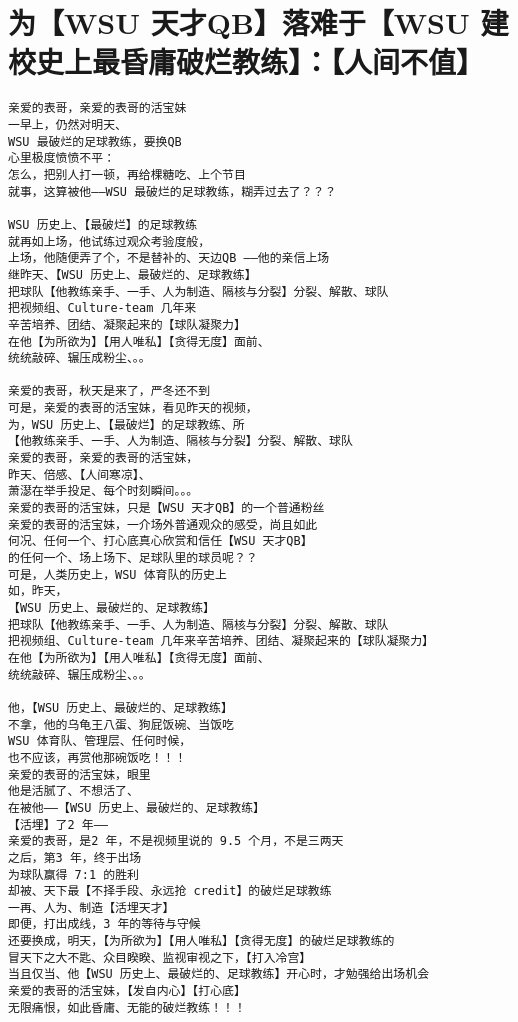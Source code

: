 \documentclass[9pt, b5paper]{article}
\begin{document}
\section{为【WSU 天才QB】落难于【WSU 建校史上最昏庸破烂教练】：【人间不值】}
\label{sec-6}
\begin{verbatim}
亲爱的表哥，亲爱的表哥的活宝妹
一早上，仍然对明天、
WSU 最破烂的足球教练，要换QB
心里极度愤愤不平：
怎么，把别人打一顿，再给棵糖吃、上个节目
就事，这算被他——WSU 最破烂的足球教练，糊弄过去了？？？

WSU 历史上、【最破烂】的足球教练
就再如上场，他试练过观众考验度般，
上场，他随便弄了个，不是替补的、天边QB ——他的亲信上场
继昨天、【WSU 历史上、最破烂的、足球教练】
把球队【他教练亲手、一手、人为制造、隔核与分裂】分裂、解散、球队
把视频组、Culture-team 几年来
辛苦培养、团结、凝聚起来的【球队凝聚力】
在他【为所欲为】【用人唯私】【贪得无度】面前、
统统敲碎、辗压成粉尘、。。

亲爱的表哥，秋天是来了，严冬还不到
可是，亲爱的表哥的活宝妹，看见昨天的视频，
为，WSU 历史上、【最破烂】的足球教练、所
【他教练亲手、一手、人为制造、隔核与分裂】分裂、解散、球队
亲爱的表哥，亲爱的表哥的活宝妹，
昨天、倍感、【人间寒凉】、
萧濏在举手投足、每个时刻瞬间。。。
亲爱的表哥的活宝妹，只是【WSU 天才QB】的一个普通粉丝
亲爱的表哥的活宝妹，一介场外普通观众的感受，尚且如此
何况、任何一个、打心底真心欣赏和信任【WSU 天才QB】
的任何一个、场上场下、足球队里的球员呢？？
可是，人类历史上，WSU 体育队的历史上
如，昨天，
【WSU 历史上、最破烂的、足球教练】
把球队【他教练亲手、一手、人为制造、隔核与分裂】分裂、解散、球队
把视频组、Culture-team 几年来辛苦培养、团结、凝聚起来的【球队凝聚力】
在他【为所欲为】【用人唯私】【贪得无度】面前、
统统敲碎、辗压成粉尘、。。

他，【WSU 历史上、最破烂的、足球教练】
不拿，他的乌龟王八蛋、狗屁饭碗、当饭吃
WSU 体育队、管理层、任何时候，
也不应该，再赏他那碗饭吃！！！
亲爱的表哥的活宝妹，眼里
他是活腻了、不想活了、
在被他——【WSU 历史上、最破烂的、足球教练】
【活埋】了2 年——
亲爱的表哥，是2 年，不是视频里说的 9.5 个月，不是三两天
之后，第3 年，终于出场
为球队赢得 7:1 的胜利
却被、天下最【不择手段、永远抢 credit】的破烂足球教练
一再、人为、制造【活埋天才】
即便，打出成线，3 年的等待与守候
还要换成，明天，【为所欲为】【用人唯私】【贪得无度】的破烂足球教练的
冒天下之大不匙、众目睽睽、监视审视之下，【打入冷宫】
当且仅当、他【WSU 历史上、最破烂的、足球教练】开心时，才勉强给出场机会
亲爱的表哥的活宝妹，【发自内心】【打心底】
无限痛恨，如此昏庸、无能的破烂教练！！！


\end{verbatim}
\end{document}
